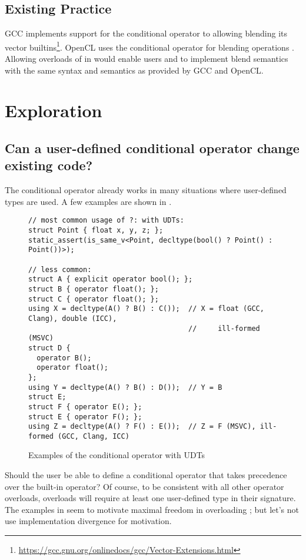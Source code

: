 \subsection{Existing Practice}
GCC implements support for the conditional operator to allowing blending its vector builtins\footnote{\url{https://gcc.gnu.org/onlinedocs/gcc/Vector-Extensions.html}}.
OpenCL uses the conditional operator for blending operations \cite{spec.opencl1.1}.
Allowing overloads of  in \CC{} would enable users and  to implement blend semantics with the same syntax and semantics as provided by GCC and OpenCL.

\section{Exploration}

\subsection{Can a user-defined conditional operator change existing code?}

The conditional operator already works in many situations where user-defined types are used.
A few examples are shown in .
\begin{figure}[bht]\begin{lstlisting}
// most common usage of ?: with UDTs:
struct Point { float x, y, z; };
static_assert(is_same_v<Point, decltype(bool() ? Point() : Point())>);

// less common:
struct A { explicit operator bool(); };
struct B { operator float(); };
struct C { operator float(); };
using X = decltype(A() ? B() : C());  // X = float (GCC, Clang), double (ICC),
                                      //     ill-formed (MSVC)
struct D {
  operator B();
  operator float();
};
using Y = decltype(A() ? B() : D());  // Y = B
struct E;
struct F { operator E(); };
struct E { operator F(); };
using Z = decltype(A() ? F() : E());  // Z = F (MSVC), ill-formed (GCC, Clang, ICC)
\end{lstlisting}
\caption{Examples of the conditional operator with UDTs}
\label{fig:udt-cond-examples}
\end{figure}

Should the user be able to define a conditional operator that takes precedence over the built-in operator?
Of course, to be consistent with all other operator overloads,  overloads will require at least one user-defined type in their signature.
The examples in  seem to motivate maximal freedom in overloading ; but let's not use implementation divergence for motivation.


